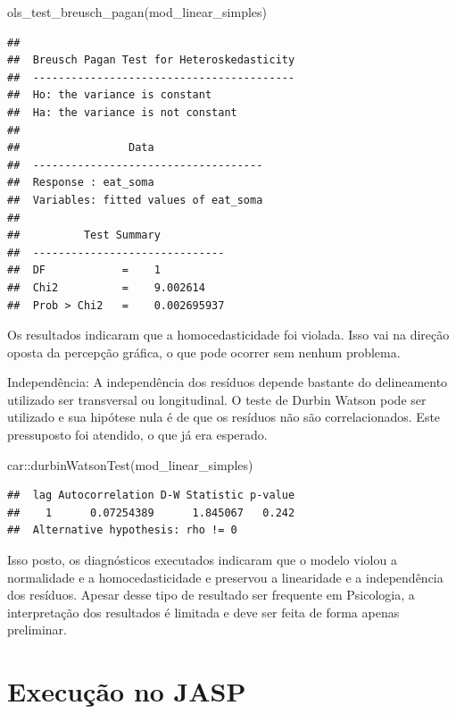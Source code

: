 \documentclass[
]{book}
\newenvironment{Shaded}{\begin{snugshade}}{\end{snugshade}}
\newcommand{\FunctionTok}[1]{\textcolor[rgb]{0.00,0.00,0.00}{#1}}
\newcommand{\NormalTok}[1]{#1}
\newcommand{\SpecialCharTok}[1]{\textcolor[rgb]{0.00,0.00,0.00}{#1}}
\begin{document}
\begin{Shaded}
\begin{Highlighting}[]
\FunctionTok{ols\_test\_breusch\_pagan}\NormalTok{(mod\_linear\_simples)}
\end{Highlighting}
\end{Shaded}

\begin{verbatim}
## 
##  Breusch Pagan Test for Heteroskedasticity
##  -----------------------------------------
##  Ho: the variance is constant            
##  Ha: the variance is not constant        
## 
##                 Data                 
##  ------------------------------------
##  Response : eat_soma 
##  Variables: fitted values of eat_soma 
## 
##          Test Summary          
##  ------------------------------
##  DF            =    1 
##  Chi2          =    9.002614 
##  Prob > Chi2   =    0.002695937
\end{verbatim}

Os resultados indicaram que a homocedasticidade foi violada. Isso vai na direção oposta da percepção gráfica, o que pode ocorrer sem nenhum problema.

Independência: A independência dos resíduos depende bastante do delineamento utilizado ser transversal ou longitudinal. O teste de Durbin Watson pode ser utilizado e sua hipótese nula é de que os resíduos não são correlacionados. Este pressuposto foi atendido, o que já era esperado.

\begin{Shaded}
\begin{Highlighting}[]
\NormalTok{car}\SpecialCharTok{::}\FunctionTok{durbinWatsonTest}\NormalTok{(mod\_linear\_simples)}
\end{Highlighting}
\end{Shaded}

\begin{verbatim}
##  lag Autocorrelation D-W Statistic p-value
##    1      0.07254389      1.845067   0.242
##  Alternative hypothesis: rho != 0
\end{verbatim}

Isso posto, os diagnósticos executados indicaram que o modelo violou a normalidade e a homocedasticidade e preservou a linearidade e a independência dos resíduos. Apesar desse tipo de resultado ser frequente em Psicologia, a interpretação dos resultados é limitada e deve ser feita de forma apenas preliminar.

\hypertarget{execuuxe7uxe3o-no-jasp-15}{%
\section{Execução no JASP}\label{execuuxe7uxe3o-no-jasp-15}}
\end{document}
